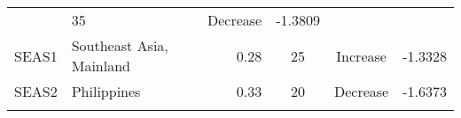 \documentclass[]{article}
\begin{document}
\begin{longtable}[]{@{}clrccr@{}}
\begin{minipage}[t]{0.11\columnwidth}
\strut
\end{minipage} & \begin{minipage}[t]{0.10\columnwidth}\centering\strut
35\strut
\end{minipage} & \begin{minipage}[t]{0.16\columnwidth}\centering\strut
Decrease\strut
\end{minipage} & \begin{minipage}[t]{0.09\columnwidth}\raggedleft\strut
-1.3809\strut
\end{minipage}\tabularnewline
\begin{minipage}[t]{0.08\columnwidth}\centering\strut
SEAS1\strut
\end{minipage} & \begin{minipage}[t]{0.29\columnwidth}\raggedright\strut
Southeast Asia, Mainland\strut
\end{minipage} & \begin{minipage}[t]{0.11\columnwidth}\raggedleft\strut
0.28\strut
\end{minipage} & \begin{minipage}[t]{0.10\columnwidth}\centering\strut
25\strut
\end{minipage} & \begin{minipage}[t]{0.16\columnwidth}\centering\strut
Increase\strut
\end{minipage} & \begin{minipage}[t]{0.09\columnwidth}\raggedleft\strut
-1.3328\strut
\end{minipage}\tabularnewline
\begin{minipage}[t]{0.08\columnwidth}\centering\strut
SEAS2\strut
\end{minipage} & \begin{minipage}[t]{0.29\columnwidth}\raggedright\strut
Philippines\strut
\end{minipage} & \begin{minipage}[t]{0.11\columnwidth}\raggedleft\strut
0.33\strut
\end{minipage} & \begin{minipage}[t]{0.10\columnwidth}\centering\strut
20\strut
\end{minipage} & \begin{minipage}[t]{0.16\columnwidth}\centering\strut
Decrease\strut
\end{minipage} & \begin{minipage}[t]{0.09\columnwidth}\raggedleft\strut
-1.6373\strut
\end{minipage}\tabularnewline
\begin{minipage}[t]{0.08\columnwidth}\centering\strut

\end{minipage}
\end{longtable}
\end{document}
